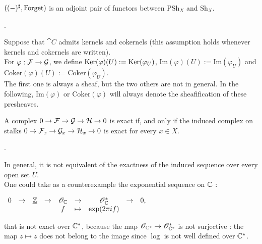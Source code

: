 \begin{myprop}
$((\--)^\sharp,\text{Forget})$ is an adjoint pair of functors between $\text{PSh}_X$ and $\text{Sh}_X$.
\end{myprop}

\begin{mydemo}
.
\end{mydemo}

\begin{myex}
Suppose that $\cat{C}$ admits kernels and cokernels (this assumption holds whenever kernels and cokernels are written). \\
For $\varphi: \mathcal{F} \to \mathcal{G}$, we define $\text{Ker}(\varphi)(U) := \text{Ker}(\varphi_U)$, $\text{Im}(\varphi)(U) := \text{Im}(\varphi_U)$ and $\text{Coker}(\varphi)(U) := \text{Coker}(\varphi_U)$.\\
The first one is always a sheaf, but the two others are not in general. In the following, $\text{Im}(\varphi)$ or $\text{Coker}(\varphi)$ will always denote the sheafification of these presheaves.
\end{myex}

\begin{myprop}
A complex $0 \to \mathcal{F} \to \mathcal{G} \to \mathcal{H} \to 0$ is exact if, and only if the induced complex on stalks $0 \to \mathcal{F}_x \to \mathcal{G}_x \to \mathcal{H}_x \to 0$ is exact for every $x\in X$.
\end{myprop}

\begin{mydemo}
.
\end{mydemo}

\begin{myrem}
In general, it is not equivalent of the exactness of the induced sequence over every open set $U$.\\
One could take as a counterexample the exponential sequence on $\mathbb{C}$ :
\begin{center}
$
\begin{array}{c c c c c c c c c}
0 & \to & \underline{\mathbb{Z}} & \to & \mathscr{O}_{\mathbb{C}} & \to & \mathscr{O}_{\mathbb{C}}^* & \to & 0,\\
  &     &                &     &   f       & \mapsto & \exp(2\pi i f) & &\\
\end{array}
$
\end{center}
that is not exact over $\mathbb{C}^*$, because the map $\mathscr{O}_{\mathbb{C}^*} \to \mathscr{O}_{\mathbb{C}^*}^*$ is not surjective : the map $z \mapsto z$ does not belong to the image since $\log$ is not well defined over $\mathbb{C}^*$.
\end{myrem}



